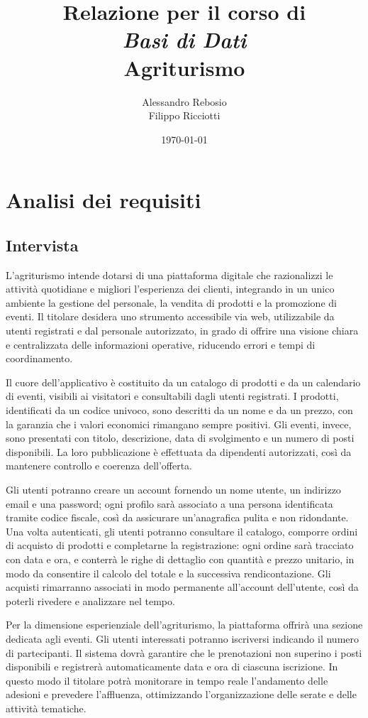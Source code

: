 \documentclass[a4paper,12pt]{report}
\title{
  \vspace*{2cm}
  \LARGE Relazione per il corso di \\[0.5cm]
  \textit{Basi di Dati} \\[2cm]
  \Huge\textbf{Agriturismo} \\[2cm]
}
\author{
  \Large
  Alessandro Rebosio \\
  Filippo Ricciotti
}
\date{
  \vspace{4cm}
  \today \\
}
\begin{document}
\maketitle

\tableofcontents

\chapter{Analisi dei requisiti}
\section{Intervista}
L'agriturismo intende dotarsi di una piattaforma digitale che
razionalizzi le attività quotidiane e migliori l'esperienza dei
clienti, integrando in un unico ambiente la gestione del personale,
la vendita di prodotti e la promozione di eventi. Il titolare
desidera uno strumento accessibile via web, utilizzabile da utenti
registrati e dal personale autorizzato, in grado di offrire una
visione chiara e centralizzata delle informazioni operative,
riducendo errori e tempi di coordinamento.

Il cuore dell'applicativo è costituito da un catalogo di prodotti e
da un calendario di eventi, visibili ai visitatori e consultabili
dagli utenti registrati. I prodotti, identificati da un codice
univoco, sono descritti da un nome e da un prezzo, con la garanzia
che i valori economici rimangano sempre positivi. Gli eventi, invece,
sono presentati con titolo, descrizione, data di svolgimento e un
numero di posti disponibili. La loro pubblicazione è effettuata da
dipendenti autorizzati, così da mantenere controllo e coerenza
dell'offerta.

Gli utenti potranno creare un account fornendo un nome utente, un
indirizzo email e una password; ogni profilo sarà associato a una
persona identificata tramite codice fiscale, così da assicurare
un'anagrafica pulita e non ridondante. Una volta autenticati, gli
utenti potranno consultare il catalogo, comporre ordini di acquisto
di prodotti e completarne la registrazione: ogni ordine sarà
tracciato con data e ora, e conterrà le righe di dettaglio con
quantità e prezzo unitario, in modo da consentire il calcolo del
totale e la successiva rendicontazione. Gli acquisti rimarranno
associati in modo permanente all'account dell'utente, così da poterli
rivedere e analizzare nel tempo.

Per la dimensione esperienziale dell'agriturismo, la piattaforma
offrirà una sezione dedicata agli eventi. Gli utenti interessati
potranno iscriversi indicando il numero di partecipanti. Il sistema
dovrà garantire che le prenotazioni non superino i posti disponibili
e registrerà automaticamente data e ora di ciascuna iscrizione. In
questo modo il titolare potrà monitorare in tempo reale l'andamento
delle adesioni e prevedere l'affluenza, ottimizzando l'organizzazione
delle serate e delle attività tematiche.
\end{document}
